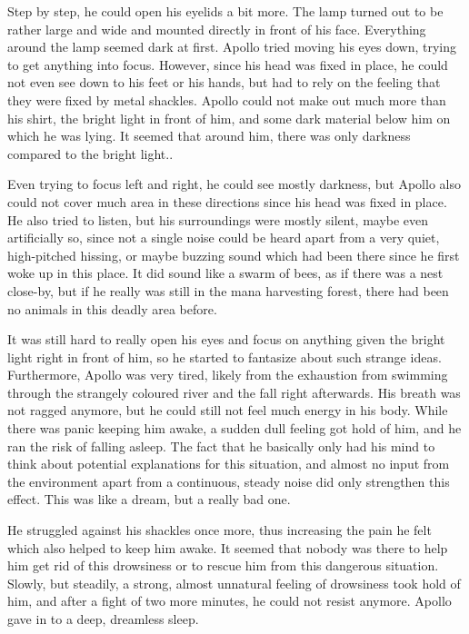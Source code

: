 Step by step, he could open his eyelids a bit more. The lamp turned out to be rather large and wide and mounted directly in front of his face. Everything around the lamp seemed dark at first. Apollo tried moving his eyes down, trying to get anything into focus. However, since his head was fixed in place, he could not even see down to his feet or his hands, but had to rely on the feeling that they were fixed by metal shackles. Apollo could not make out much more than his shirt, the bright light in front of him, and some dark material below him on which he was lying. It seemed that around him, there was only darkness compared to the bright light..

Even trying to focus left and right, he could see mostly darkness, but Apollo also could not cover much area in these directions since his head was fixed in place. He also tried to listen, but his surroundings were mostly silent, maybe even artificially so, since not a single noise could be heard apart from a very quiet, high-pitched hissing, or maybe buzzing sound which had been there since he first woke up in this place. It did sound like a swarm of bees, as if there was a nest close-by, but if he really was still in the mana harvesting forest, there had been no animals in this deadly area before. 

It was still hard to really open his eyes and focus on anything given the bright light right in front of him, so he started to fantasize about such strange ideas. Furthermore, Apollo was very tired, likely from the exhaustion from swimming through the strangely coloured river and the fall right afterwards. His breath was not ragged anymore, but he could still not feel much energy in his body. While there was panic keeping him awake, a sudden dull feeling got hold of him, and he ran the risk of falling asleep. The fact that he basically only had his mind to think about potential explanations for this situation, and almost no input from the environment apart from a continuous, steady noise did only strengthen this effect. This was like a dream, but a really bad one.

He struggled against his shackles once more, thus increasing the pain he felt which also helped to keep him awake. It seemed that nobody was there to help him get rid of this drowsiness or to rescue him from this dangerous situation. Slowly, but steadily, a strong, almost unnatural feeling of drowsiness took hold of him, and after a fight of two more minutes, he could not resist anymore. Apollo gave in to a deep, dreamless sleep.


